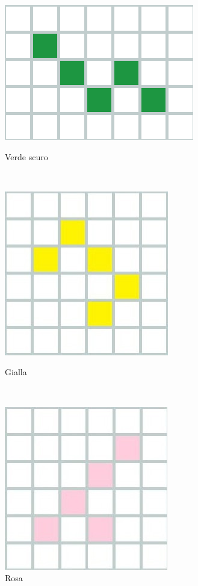 \begin{figure}[h]
	
	\begin{minipage}{3.5cm}
		\centering
		\includegraphics[scale=0.30]{immagini/bigz}
		\caption{Verde scuro}
		\label{bigz}
	\end{minipage}
	\ \hspace{2mm} \hspace{3mm} \
	\begin{minipage}{3.5cm}
		\centering
		\includegraphics[scale=0.25]{immagini/yellow}
		\caption{Gialla}
		\label{c}
	\end{minipage}
	\ \hspace{2mm} \hspace{3mm} \
	\begin{minipage}{3.5cm}
		\centering
		\includegraphics[scale=0.25]{immagini/Y}
		\caption{Rosa}
		\label{y}
	\end{minipage}
\end{figure}

